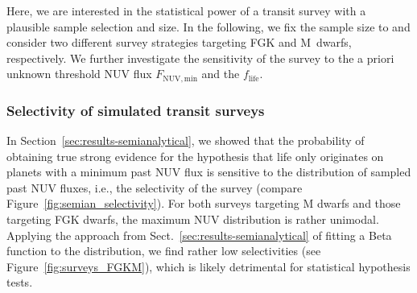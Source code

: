 \documentclass[twocolumn,twocolappendix,linenumbers]{aastex631}
\begin{document}
Here, we are interested in the statistical power of a transit survey with a plausible sample selection and size.
In the following, we fix the sample size to  and consider two different survey strategies targeting FGK and M~dwarfs, respectively.
We further investigate the sensitivity of the survey to the a priori unknown threshold \gls{NUV} flux $F_\mathrm{NUV, min}$ and the  $f_\mathrm{life}$.

\subsubsection{Selectivity of simulated transit surveys}
In Section~\ref{sec:results-semianalytical}, we showed that the probability of obtaining true strong evidence for the hypothesis that life only originates on planets with a minimum past \gls{NUV} flux is sensitive to the distribution of sampled past \gls{NUV} fluxes, i.e., the selectivity of the survey (compare Figure~\ref{fig:semian_selectivity}).
For both surveys targeting M dwarfs and those targeting FGK dwarfs, the maximum \gls{NUV} distribution is rather unimodal.
Applying the approach from Sect.~\ref{sec:results-semianalytical} of fitting a Beta function to the distribution, we find rather low selectivities (see Figure~\ref{fig:surveys_FGKM}), which is likely detrimental for statistical hypothesis tests.

\end{document}
